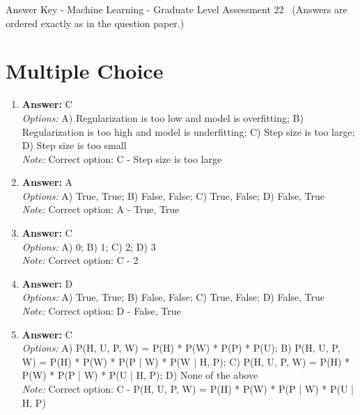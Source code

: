 \documentclass[12pt]{article}
\begin{document}
\begin{center}
Answer Key - Machine Learning - Graduate Level Assessment 22 \
\small (Answers are ordered exactly as in the question paper.)
\end{center}

\section*{Multiple Choice}
\begin{enumerate}[label=\arabic*.]
\item \textbf{Answer:} C
\\ \textit{Options:} A) Regularization is too low and model is overfitting; B) Regularization is too high and model is underfitting; C) Step size is too large; D) Step size is too small
\\ \textit{Note:} Correct option: C - Step size is too large
\item \textbf{Answer:} A
\\ \textit{Options:} A) True, True; B) False, False; C) True, False; D) False, True
\\ \textit{Note:} Correct option: A - True, True
\item \textbf{Answer:} C
\\ \textit{Options:} A) 0; B) 1; C) 2; D) 3
\\ \textit{Note:} Correct option: C - 2
\item \textbf{Answer:} D
\\ \textit{Options:} A) True, True; B) False, False; C) True, False; D) False, True
\\ \textit{Note:} Correct option: D - False, True
\item \textbf{Answer:} C
\\ \textit{Options:} A) P(H, U, P, W) = P(H) * P(W) * P(P) * P(U); B) P(H, U, P, W) = P(H) * P(W) * P(P | W) * P(W | H, P); C) P(H, U, P, W) = P(H) * P(W) * P(P | W) * P(U | H, P); D) None of the above
\\ \textit{Note:} Correct option: C - P(H, U, P, W) = P(H) * P(W) * P(P | W) * P(U | H, P)
\end{enumerate}
\end{document}
